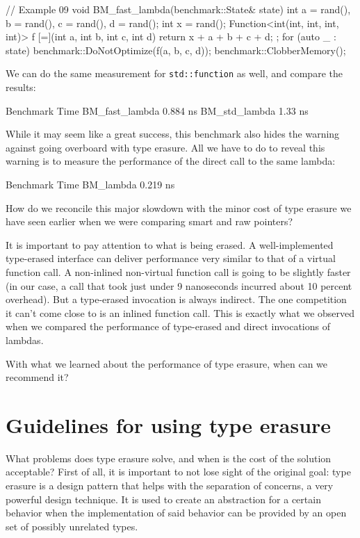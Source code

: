{\begin{code}
// Example 09
void BM_fast_lambda(benchmark::State& state) {
  int a = rand(), b = rand(), c = rand(), d = rand();
  int x = rand();
  Function<int(int, int, int, int)> f {
    [=](int a, int b, int c, int d) {
      return x + a + b + c + d; }
  };
  for (auto _ : state) {
    benchmark::DoNotOptimize(f(a, b, c, d));
    benchmark::ClobberMemory();
  }
}
\end{code}

We can do the same measurement for \texttt{std::function} as well, and compare the results:

\begin{code}
Benchmark                      Time
BM_fast_lambda                 0.884 ns
BM_std_lambda                   1.33 ns
\end{code}

While it may seem like a great success, this benchmark also hides the warning against going overboard with type erasure. All we have to do to reveal this warning is to measure the performance of the direct call to the same lambda:

\begin{code}
Benchmark                      Time
BM_lambda                      0.219 ns
\end{code}

How do we reconcile this major slowdown with the minor cost of type erasure we have seen earlier when we were comparing smart and raw pointers?

It is important to pay attention to what is being erased. A well-implemented type-erased interface can deliver performance very similar to that of a virtual function call. A non-inlined non-virtual function call is going to be slightly faster (in our case, a call that took just under 9 nanoseconds incurred about 10 percent overhead). But a type-erased invocation is always indirect. The one competition it can't come close to is an inlined function call. This is exactly what we observed when we compared the performance of type-erased and direct invocations of lambdas.

With what we learned about the performance of type erasure, when can we recommend it?

\section{Guidelines for using type erasure}

What problems does type erasure solve, and when is the cost of the solution acceptable? First of all, it is important to not lose sight of the original goal: type erasure is a design pattern that helps with the separation of concerns, a very powerful design technique. It is used to create an abstraction for a certain behavior when the implementation of said behavior can be provided by an open set of possibly unrelated types.

}
